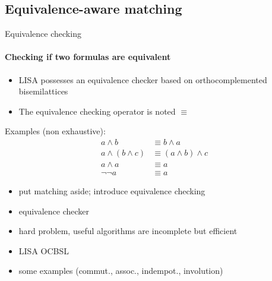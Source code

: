 
\subsection{Equivalence-aware matching}

\begin{frame}{Equivalence checking}
\framesubtitle{Checking if two formulas are equivalent}

\begin{itemize}
\item LISA possesses an equivalence checker based on orthocomplemented bisemilattices
\item The equivalence checking operator is noted $\equiv$
\end{itemize}

\vspace{0.25cm}

Examples (non exhaustive):
\begin{align*}
a \land b &\equiv b \land a \\
a \land (b \land c) &\equiv (a \land b) \land c \\
a \land a &\equiv a \\
\neg\neg a &\equiv a
\end{align*}

{
\begin{itemize}
\item put matching aside; introduce equivalence checking
\item equivalence checker
\item hard problem, useful algorithms are incomplete but efficient
\item LISA OCBSL
\item some examples (commut., assoc., indempot., involution)
\end{itemize}
}

\end{frame}

